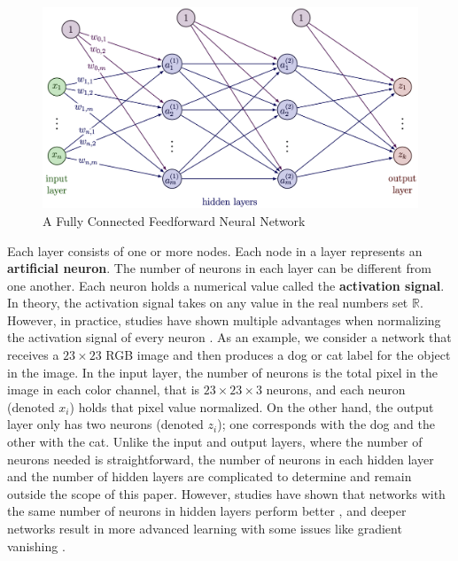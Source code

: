 \begin{figure}[!ht]
    \centering
    \includegraphics[width=5in]{figures/ffn_diagram.png}
    \caption{A Fully Connected Feedforward Neural Network} \label{fig:fc_ffn}
\end{figure}

Each layer consists of one or more nodes. Each node in a layer represents an \textbf{artificial neuron}. The number of neurons in each layer can be different from one another. Each neuron holds a numerical value called the \textbf{activation signal}. In theory, the activation signal takes on any value in the real numbers set $\mathbb{R}$. However, in practice, studies have shown multiple advantages when normalizing the activation signal of every neuron \cite{lecun2012efficient}. As an example, we consider a network that receives a $23 \times 23$ RGB image and then produces a dog or cat label for the object in the image. In the input layer, the number of neurons is the total pixel in the image in each color channel, that is $23 \times 23 \times 3$ neurons, and each neuron (denoted $x_i$) holds that pixel value normalized. On the other hand, the output layer only has two neurons (denoted $z_i$); one corresponds with the dog and the other with the cat. Unlike the input and output layers, where the number of neurons needed is straightforward, the number of neurons in each hidden layer and the number of hidden layers are complicated to determine and remain outside the scope of this paper. However, studies have shown that networks with the same number of neurons in hidden layers perform better \cite{taylor2017neural}, and deeper networks result in more advanced learning with some issues like gradient vanishing \cite{lecun2015deep}.


